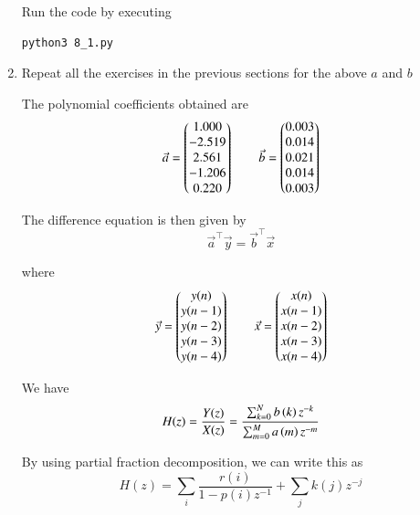 \documentclass[journal,12pt,twocolumn]{IEEEtran}
\renewcommand\thesection{\arabic{section}}
\begin{document}
\begin{enumerate}[label=\thesection.\arabic*]
               Run the code by executing
               \begin{lstlisting}
python3 8_1.py
               \end{lstlisting}

          \item Repeat all the exercises in the previous sections for the above $a$ and $b$

               \solution The polynomial coefficients obtained are
               \begin{align}
                    \vec{a} = \begin{pmatrix}1.000 \\ -2.519 \\ 2.561 \\ -1.206 \\ 0.220\end{pmatrix} \qquad
                    \vec{b} = \begin{pmatrix}0.003 \\ 0.014 \\ 0.021 \\ 0.014 \\ 0.003\end{pmatrix}
               \end{align}

               The difference equation is then given by
               \begin{equation}
                    \vec{a}^\top \vec{y} = \vec{b}^\top \vec{x}
               \end{equation}

               where
               \begin{align}
                    \vec{y} = \begin{pmatrix}y(n) \\ y(n-1) \\ y(n-2) \\ y(n-3) \\ y(n-4)\end{pmatrix} \qquad
                    \vec{x} = \begin{pmatrix}x(n) \\ x(n-1) \\ x(n-2) \\ x(n-3) \\ x(n-4)\end{pmatrix}
               \end{align}

               We have
               \begin{equation}
                    H(z) = \frac{Y(z)}{X(z)} = \frac{\sum _{k=0}^{N}b\left(k\right) z^{-k}}{\sum _{m=0}^{M}a\left(m\right) z^{-m}}
               \end{equation}

               By using partial fraction decomposition, we can write this as
               \begin{equation}
                    H(z) = \sum_i \frac{r(i)}{1-p(i)z^{-1}} + \sum_j k(j)z^{-j}
               \end{equation}


\end{enumerate}
\end{document}
